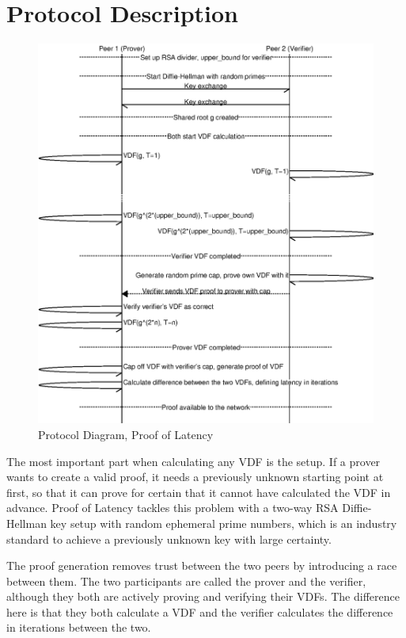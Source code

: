 \section{Protocol Description}
\begin{figure}
	\includegraphics[width=\textwidth]{pictures/pol2_diagram.eps}
	\caption{Protocol Diagram, Proof of Latency}
	\label{PoL Diagram 2}
\end{figure}
The most important part when calculating any VDF is the setup. If a prover wants to create a valid proof, it needs a previously unknown starting point at first, so that it can prove for certain that it cannot have calculated the VDF in advance. Proof of Latency tackles this problem with a two-way RSA Diffie-Hellman key setup with random ephemeral prime numbers, which is an industry standard to achieve a previously unknown key with large certainty. 

The proof generation removes trust between the two peers by introducing a race between them. The two participants are called the prover and the verifier, although they both are actively proving and verifying their VDFs. The difference here is that they both calculate a VDF and the verifier calculates the difference in iterations between the two.

